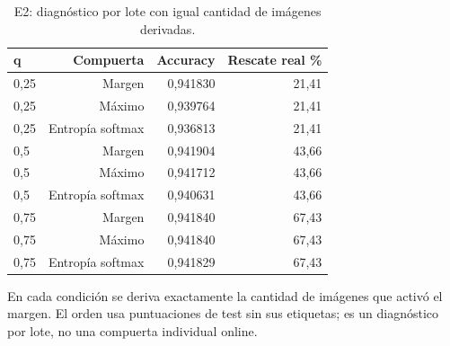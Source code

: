 \begin{table}[!htbp]\centering
\fontsize{8}{10}\selectfont\setlength{\tabcolsep}{4pt}
\caption{E2: diagnóstico por lote con igual cantidad de imágenes derivadas.}\label{tab:e2-matched}
\begin{tabular}{@{}lrrr@{}}\toprule
q & Compuerta & Accuracy & Rescate real \%\\\midrule
0,25 & Margen & 0,941830 & 21,41\\
0,25 & Máximo & 0,939764 & 21,41\\
0,25 & Entropía softmax & 0,936813 & 21,41\\
0,5 & Margen & 0,941904 & 43,66\\
0,5 & Máximo & 0,941712 & 43,66\\
0,5 & Entropía softmax & 0,940631 & 43,66\\
0,75 & Margen & 0,941840 & 67,43\\
0,75 & Máximo & 0,941840 & 67,43\\
0,75 & Entropía softmax & 0,941829 & 67,43\\
\bottomrule\end{tabular}
\par\smallskip\begin{minipage}{0.98\textwidth}\footnotesize En cada condición se deriva exactamente la cantidad de imágenes que activó el margen. El orden usa puntuaciones de test sin sus etiquetas; es un diagnóstico por lote, no una compuerta individual online.\end{minipage}
\end{table}
